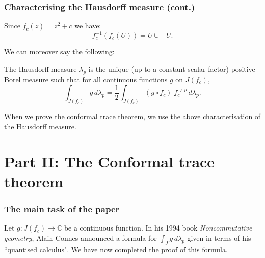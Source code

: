 \documentclass{beamer} %
\theoremstyle{definition} %
\newcommand{\Cplx}{\mathbb{C}}
\begin{document}
\begin{frame}\frametitle{Characterising the Hausdorff measure (cont.)}
    Since $f_c(z) = z^2+c$ we have:
    \begin{equation*}
        f_c^{-1}(f_c(U)) = U\cup -U.
    \end{equation*}
    
    We can moreover say the following:
    \begin{theorem}
        The Hausdorff measure $\lambda_p$ is the unique (up to a constant scalar factor) positive Borel measure such that for all continuous functions $g$ on $J(f_c)$,
        \begin{equation*}
            \int_{J(f_c)} g\,d\lambda_p = \frac{1}{2}\int_{J(f_c)} (g\circ f_c)|f_c'|^p\,d\lambda_p.
        \end{equation*}
    \end{theorem}
    When we prove the conformal trace theorem, we use the above characterisation of the Hausdorff measure.
\end{frame}



\section{Part II: The Conformal trace theorem}

\begin{frame}\frametitle{The main task of the paper}
    Let $g:J(f_c) \to\Cplx$ be a continuous function. In his 1994 book \emph{Noncommutative geometry}, Alain Connes 
    announced a formula for $\int_J g\,d\lambda_p$ given in terms of his ``quantised calculus". We have now completed the proof
    of this formula.
\end{frame}
\end{document}
